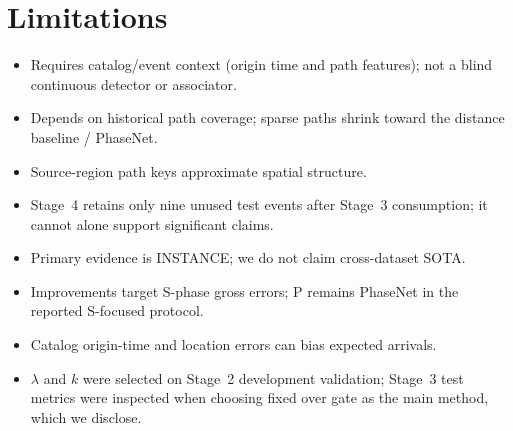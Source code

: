 \section{Limitations}
\label{sec:lim}

\begin{itemize}
\item Requires catalog/event context (origin time and path features); not a
blind continuous detector or associator.
\item Depends on historical path coverage; sparse paths shrink toward the
distance baseline / PhaseNet.
\item Source-region path keys approximate spatial structure.
\item Stage~4 retains only nine unused test events after Stage~3 consumption;
it cannot alone support significant claims.
\item Primary evidence is INSTANCE; we do not claim cross-dataset SOTA.
\item Improvements target S-phase gross errors; P remains PhaseNet in the
reported S-focused protocol.
\item Catalog origin-time and location errors can bias expected arrivals.
\item $\lambda$ and $k$ were selected on Stage~2 development validation; Stage~3
test metrics were inspected when choosing fixed over gate as the main method,
which we disclose.
\end{itemize}

